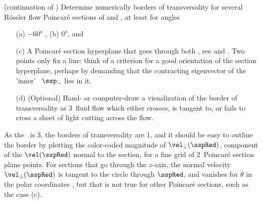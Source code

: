 {\label{e:RosslTransv}
(continuation of )
Determine numerically borders of transversality  for
several R\"ossler flow Poincar\'e sections of 
and , at least for angles
\begin{itemize}
\item[(a)] $-60^o$
, (b) $0^o$, and
\item[(c)] A Poincar\'e section hyperplane that goes through both \eqva,
see  and . Two points only fix a line:
think of a criterion for a good orientation of the section hyperplane,
perhaps by demanding that the contracting eigenvector of the 'inner'
\eqv\ $\ssp_{-}$ lies in it.
\item[(d)] (Optional) Hand- or computer-draw a visualization of the
border of transversality as 3\dmn\ fluid flow which either crosses,
is tangent to, or fails to cross a sheet of light cutting across the
flow.
\end{itemize}
As the \statesp\ is 3\dmn, the borders of transversality are 1\dmn, and
it should be easy to outline the border by plotting the color-coded
magnitude of $\vel_\perp(\sspRed)$, component of the $\vel(\sspRed)$
normal to the section, for a fine grid of 2\dmn\ Poincar\'e section plane
points. For sections that go through the $z$-axis, the normal velocity
$\vel_\perp(\sspRed)$ is tangent to the circle through $\sspRed$, and
vanishes for $\dot{\theta}$ in the polar coordinates , but
that is not true for other Poincar\'e sections, such as the case (c).

\authorPC
    }%


